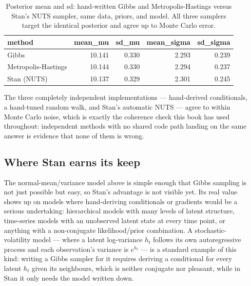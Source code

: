 \documentclass[
  letterpaper,
  DIV=11,
  numbers=noendperiod]{scrreprt}
\newcounter{none} %
\begin{document}
{

\begin{longtable}[]{@{}lrrrr@{}}

\caption{\label{tbl-stan-vs-hand}Posterior mean and sd: hand-written
Gibbs and Metropolis-Hastings versus Stan's NUTS sampler, same data,
priors, and model. All three samplers target the identical posterior and
agree up to Monte Carlo error.}

\tabularnewline

\toprule\noalign{}
method & mean\_mu & sd\_mu & mean\_sigma & sd\_sigma \\
\midrule\noalign{}
\endhead
\bottomrule\noalign{}
\endlastfoot
Gibbs & 10.141 & 0.330 & 2.293 & 0.239 \\
Metropolis-Hastings & 10.144 & 0.330 & 2.294 & 0.237 \\
Stan (NUTS) & 10.137 & 0.329 & 2.301 & 0.245 \\

\end{longtable}

}

The three completely independent implementations --- hand-derived
conditionals, a hand-tuned random walk, and Stan's automatic NUTS ---
agree to within Monte Carlo noise, which is exactly the coherence check
this book has used throughout: independent methods with no shared code
path landing on the same answer is evidence that none of them is wrong.

\subsection{Where Stan earns its keep}\label{where-stan-earns-its-keep}

The normal-mean/variance model above is simple enough that Gibbs
sampling is not just possible but easy, so Stan's advantage is not
visible yet. Its real value shows up on models where hand-deriving
conditionals or gradients would be a serious undertaking: hierarchical
models with many levels of latent structure, time-series models with an
unobserved latent state at every time point, or anything with a
non-conjugate likelihood/prior combination. A stochastic-volatility
model --- where a latent log-variance \(h_t\) follows its own
autoregressive process and each observation's variance is \(e^{h_t}\)
--- is a standard example of this kind: writing a Gibbs sampler for it
requires deriving a conditional for every latent \(h_t\) given its
neighbours, which is neither conjugate nor pleasant, while in Stan it
only needs the model written down.
\end{document}
